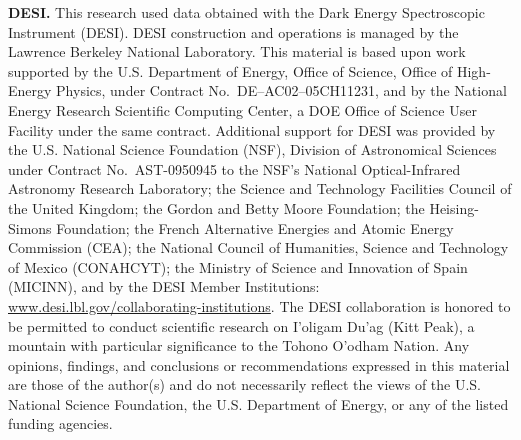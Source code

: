 \documentclass[11pt]{article}
\theoremstyle{definition}
\theoremstyle{remark}
\begin{document}
\textbf{DESI.} This research used data obtained with the Dark Energy Spectroscopic Instrument (DESI). DESI construction and operations is managed by the Lawrence Berkeley National Laboratory. This material is based upon work supported by the U.S. Department of Energy, Office of Science, Office of High-Energy Physics, under Contract No.\ DE--AC02--05CH11231, and by the National Energy Research Scientific Computing Center, a DOE Office of Science User Facility under the same contract. Additional support for DESI was provided by the U.S. National Science Foundation (NSF), Division of Astronomical Sciences under Contract No.\ AST-0950945 to the NSF's National Optical-Infrared Astronomy Research Laboratory; the Science and Technology Facilities Council of the United Kingdom; the Gordon and Betty Moore Foundation; the Heising-Simons Foundation; the French Alternative Energies and Atomic Energy Commission (CEA); the National Council of Humanities, Science and Technology of Mexico (CONAHCYT); the Ministry of Science and Innovation of Spain (MICINN), and by the DESI Member Institutions: \url{www.desi.lbl.gov/collaborating-institutions}. The DESI collaboration is honored to be permitted to conduct scientific research on I'oligam Du'ag (Kitt Peak), a mountain with particular significance to the Tohono O'odham Nation. Any opinions, findings, and conclusions or recommendations expressed in this material are those of the author(s) and do not necessarily reflect the views of the U.S. National Science Foundation, the U.S. Department of Energy, or any of the listed funding agencies.
\end{document}

